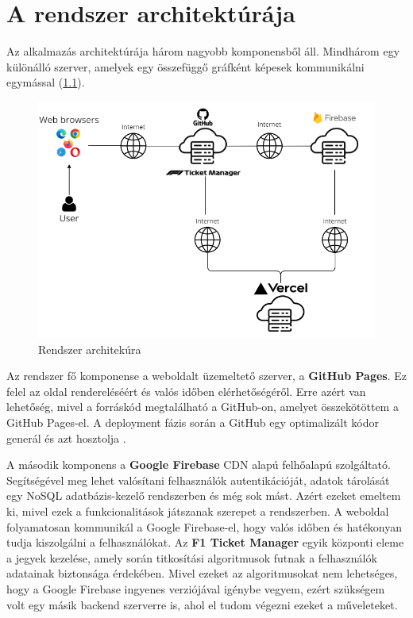 \chapter{A rendszer architektúrája}

Az alkalmazás architektúrája három nagyobb komponensből áll. Mindhárom egy különálló szerver, amelyek egy összefüggő gráfként képesek kommunikálni egymással (\ref{abra:architecture}).

\begin{figure}[!h]
	\centering
	\includegraphics[scale=0.7]{images/architecture}
	\caption{Rendszer architekúra}
	\label{abra:architecture}
\end{figure}

Az rendszer fő komponense a weboldalt üzemeltető szerver, a \textbf{GitHub Pages}. Ez felel az oldal rendereléséért és valós időben elérhetőségéről. Erre azért van lehetőség, mivel a forráskód megtalálható a GitHub-on, amelyet összekötöttem a GitHub Pages-el. A deployment fázis során a GitHub egy optimalizált kódor generál és azt hosztolja \cite{Deploy}.

A második komponens a \textbf{Google Firebase} CDN alapú felhőalapú szolgáltató. Segítségével meg lehet valósítani felhasználók autentikációját, adatok tárolását egy NoSQL adatbázis-kezelő rendszerben és még sok mást. Azért ezeket emeltem ki, mivel ezek a funkcionalitások játszanak szerepet a rendszerben. A weboldal folyamatosan kommunikál a Google Firebase-el, hogy valós időben és hatékonyan tudja kiszolgálni a felhasználókat. Az \textbf{F1 Ticket Manager} egyik központi eleme a jegyek kezelése, amely során titkosítási algoritmusok futnak a felhasználók adatainak biztonsága érdekében. Mivel ezeket az algoritmusokat nem lehetséges, hogy a Google Firebase ingyenes verziójával igénybe vegyem, ezért szükségem volt egy másik backend szerverre is, ahol el tudom végezni ezeket a műveleteket.

